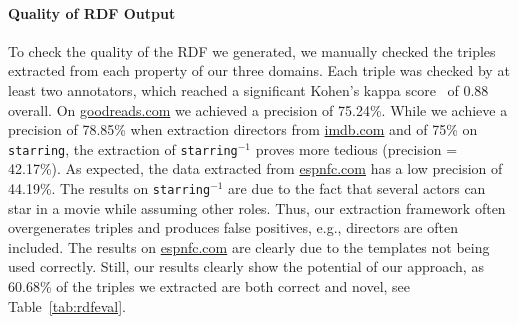 \paragraph{Quality of RDF Output}
To check the quality of the \ac{RDF} we generated, we manually checked the triples extracted from each property of our three domains.
Each triple was checked by at least two annotators, which reached a significant Kohen's kappa score~\cite{cohen1960coefficient} of 0.88 overall.
On \url{goodreads.com} we achieved a precision of 75.24\%.
While we achieve a precision of 78.85\% when extraction directors from \url{imdb.com} and of 75\% on \texttt{starring}, the extraction of \texttt{starring}$^{-1}$ proves more tedious (precision = 42.17\%).
As expected, the data extracted from \url{espnfc.com} has a low precision of 44.19\%.
The results on \texttt{starring}$^{-1}$ are due to the fact that several actors can star in a movie while assuming other roles. 
Thus, our extraction framework often overgenerates triples and produces false positives, e.g., directors are often included.
The results on \url{espnfc.com} are clearly due to the templates not being used correctly.
Still, our results clearly show the potential of our approach, as 60.68\% of the triples we extracted are both correct and novel, see Table~\ref{tab:rdfeval}.


\begin{table}[htb!]
\centering
{}
\caption{Triples generated by 100 randomly sampled pages, number of possible triples generated by using gold standard rules}
\label{tab:rdfeval}
\end{table}
